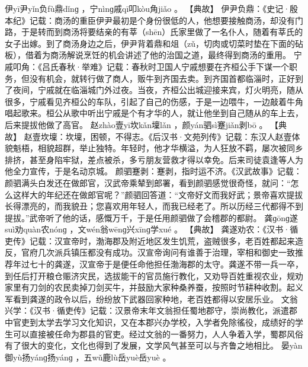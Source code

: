 \documentclass[12pt,UTF8]{ctexbook}
\begin{document}
伊yī尹yǐn负fù鼎dǐnɡ
，宁nìnɡ戚qī叩kòu角jiǎo
。
【典故】
伊尹负鼎：《史记·殷本纪》记载：商汤的重臣伊尹最初是个身份很低的人，他想要接触商汤，却没有门路，于是转而到商汤将要结亲的有莘（shēn）氏家里做了一名仆人，随着有莘氏的女子出嫁。到了商汤身边之后，伊尹背着鼎和俎（zǔ，切肉或切菜时垫在下面的砧板），借着为商汤解说烹饪的机会讲述了他的治国之道，最终得到商汤的重用。
宁戚叩角：《吕氏春秋·举难》记载：春秋时卫国人宁戚想要在齐桓公手下谋一个职务，但没有机会，就转行做了商人，贩牛到齐国去卖。到齐国首都临淄时，正好到了夜间，宁戚就在临淄城门外过夜。当夜，齐桓公出城迎接来宾，灯火明亮，随从很多，宁戚看见齐桓公的车队，引起了自己的伤感，于是一边喂牛，一边敲着牛角唱起歌来。桓公从歌中听出宁戚是个有才华的人，就让他坐到自己随从的车上去，后来提拔他做了高官。
赵zhào壹yī坎kǎn壈lǎn
，颜yán驷sì蹇jiǎn剥bō
。
【典故】
赵壹坎壈：坎壈，困顿，不得志。《后汉书·文苑列传》记载：东汉人赵壹体貌魁梧，相貌超群，举止独特。年轻时，他才华横溢，为人狂放不羁，屡次被同乡排挤，甚至身陷牢狱，差点被杀，多亏朋友营救才得以幸免。后来司徒袁逢等人为他全力宣传，于是名动京城。
颜驷蹇剥：蹇剥，指时运不济。《汉武故事》记载：颜驷满头白发还在做郎官，汉武帝乘辇到郎署，看到颜驷感觉很奇怪，就问：“怎么这样大的年纪还在做郎官呢？”颜驷回答道：“文帝好文而我好武；景帝喜欢提拔长得漂亮的，而我貌丑；您喜欢用年轻人，而我已经老了。所以历经三代都得不到提拔。”武帝听了他的话，感慨万千，于是任用颜驷做了会稽郡的都尉。
龚ɡōnɡ遂suì劝quàn农nónɡ
，文wén翁wēnɡ兴xīnɡ学xué
。
【典故】
龚遂劝农：《汉书·循吏传》记载：汉宣帝时，渤海郡及附近地区发生饥荒，盗贼很多，老百姓都起来造反，官府几次派兵镇压都没有成功。汉宣帝询问有谁善于治理，宰相和御史一致推荐年过七十的龚遂，汉宣帝于是便任命他担任渤海郡的太守。龚遂不带一兵一卒，到任后打开粮仓赈济灾民，选拔能干的官员施行教化，又劝导百姓重视农业，规劝家里有刀剑的农民卖掉刀剑买牛，并鼓励大家种桑养蚕，按照时节耕种收割。起义军看到龚遂的政令以后，纷纷放下武器回家种地，老百姓都得以安居乐业。
文翁兴学：《汉书·循吏传》记载：汉景帝末年文翁担任蜀地郡守，崇尚教化，派遣郡中官吏到太学去学习文化知识，又在本郡兴办学校，入学者免除徭役，成绩好的学生可以直接被任命为郡县的官吏。经过文翁的一番努力，人人争着入学，蜀郡风俗有了很大的变化，文化也得到了发展，文学风气甚至可以与齐鲁之地相比。
晏yàn御yù扬yánɡ扬yánɡ
，五wǔ鹿lù岳yuè岳yuè
。
\end{document}
